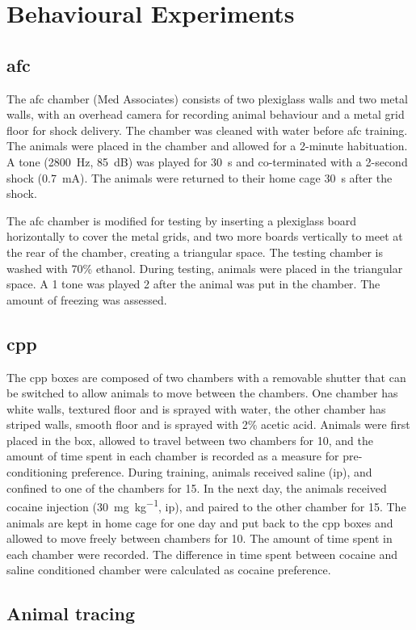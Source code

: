 \section{Behavioural Experiments}

\subsection{\Acrlong{afc}}\label{methods.afc}

The \gls{afc} chamber (Med Associates) consists of two plexiglass walls and two metal walls, with an overhead camera for recording animal behaviour and a metal grid floor for shock delivery. The chamber was cleaned with water before \gls{afc} training. The animals were placed in the chamber and allowed for a 2-minute habituation. A tone (\SI{2800}{\Hz}, \SI{85}{\dB}) was played for \SI{30}{\second} and co-terminated with a 2-second shock (\SI{0.7}{\mA}). The animals were returned to their home cage \SI{30}{\second} after the shock.

The \gls{afc} chamber is modified for testing by inserting a plexiglass board horizontally to cover the metal grids, and two more boards vertically to meet at the rear of the chamber, creating a triangular space. The testing chamber is washed with 70\% ethanol. During testing, animals were placed in the triangular space. A \SI{1}{\min} tone was played \SI{2}{\min} after the animal was put in the chamber. The amount of freezing was assessed.

\subsection{\Acrlong{cpp}}\label{methods.cpp}

 The \gls{cpp} boxes are composed of two chambers with a removable shutter that can be switched to allow animals to move between the chambers. One chamber has white walls, textured floor and is sprayed with water, the other chamber has striped walls, smooth floor and is sprayed with 2\% acetic acid. Animals were first placed in the box, allowed to travel between two chambers for \SI{10}{\min}, and the amount of time spent in each chamber is recorded as a measure for pre-conditioning preference. During training, animals received saline (\gls{ip}), and confined to one of the chambers for \SI{15}{\min}. In the next day, the animals received cocaine injection (\SI{30}{\mg\per\kg}, \gls{ip}), and paired to the other chamber for \SI{15}{\min}. The animals are kept in home cage for one day and put back to the \gls{cpp} boxes and allowed to move freely between chambers for \SI{10}{\min}. The amount of time spent in each chamber were recorded. The difference in time spent between cocaine and saline conditioned chamber were calculated as cocaine preference.

 \subsection{Animal tracing}
